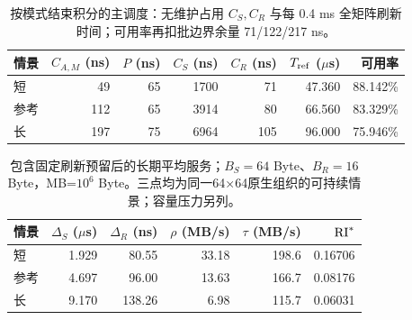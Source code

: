 \begin{table}[htbp]\centering\small
\begin{tabular}{@{}lrrrrrr@{}}\toprule
情景 & $C_{A,M}$ (ns) & $P$ (ns) & $C_S$ (ns) & $C_R$ (ns) & $T_{\rm ref}$ ($\mu$s) & 可用率\\\midrule
短 & 49 & 65 & 1700 & 71 & 47.360 & 88.142\%\\
参考 & 112 & 65 & 3914 & 80 & 66.560 & 83.329\%\\
长 & 197 & 75 & 6964 & 105 & 96.000 & 75.946\%\\
\bottomrule\end{tabular}
\caption{按模式结束积分的主调度：无维护占用 $C_S,C_R$ 与每 0.4 ms 全矩阵刷新时间；可用率再扣批边界余量 71/122/217 ns。}\end{table}
\begin{table}[htbp]\centering\small
\begin{tabular}{@{}lrrrrr@{}}\toprule
情景 & $\Delta_S$ ($\mu$s) & $\Delta_R$ (ns) & $\rho$ (MB/s) & $\tau$ (MB/s) & $\mathrm{RI}^*$\\\midrule
短 & 1.929 & 80.55 & 33.18 & 198.6 & 0.16706\\
参考 & 4.697 & 96.00 & 13.63 & 166.7 & 0.08176\\
长 & 9.170 & 138.26 & 6.98 & 115.7 & 0.06031\\
\bottomrule\end{tabular}
\caption{包含固定刷新预留后的长期平均服务；$B_S=64$ Byte、$B_R=16$ Byte，MB=$10^6$ Byte。三点均为同一64×64原生组织的可持续情景；容量压力另列。}\label{09_gain_cell_edram:tab:results}\end{table}
